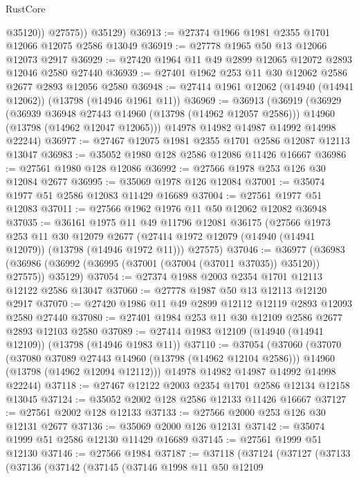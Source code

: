 \begin{lexlean}{RustCore}
\begin{coremodule}
              @35120))
          @27575))
      @35129)
@36913 := @27374 @1966 @1981 @2355 @1701 @12066 @12075 @2586 @13049
@36919 := @27778 @1965 @50 @13 @12066 @12073 @2917
@36929 := @27420 @1964 @11 @49 @2899 @12065 @12072 @2893 @12046 @2580 @27440
@36939 := @27401 @1962 @253 @11 @30 @12062 @2586 @2677 @2893 @12056 @2580
@36948 := @27414 @1961 @12062 (@14940 (@14941 @12062)) (@13798 (@14946 @1961 @11))
@36969 := @36913
    (@36919
      (@36929
        (@36939 @36948 @27443 @14960 (@13798 (@14962 @12057 @2586)))
        @14960
        (@13798 (@14962 @12047 @12065)))
      @14978
      @14982
      @14987
      @14992
      @14998
      @22244)
@36977 := @27467 @12075 @1981 @2355 @1701 @2586 @12087 @12113 @13047
@36983 := @35052 @1980 @128 @2586 @12086 @11426 @16667
@36986 := @27561 @1980 @128 @12086
@36992 := @27566 @1978 @253 @126 @30 @12084 @2677
@36995 := @35069 @1978 @126 @12084
@37001 := @35074 @1977 @51 @2586 @12083 @11429 @16689
@37004 := @27561 @1977 @51 @12083
@37011 := @27566 @1962 @1976 @11 @50 @12062 @12082 @36948
@37035 := @36161
    @1975
    @11
    @49
    @11796
    @12081
    @36175
    (@27566
      @1973
      @253
      @11
      @30
      @12079
      @2677
      (@27414 @1972 @12079 (@14940 (@14941 @12079)) (@13798 (@14946 @1972 @11)))
      @27575)
@37046 := @36977
    (@36983 (@36986 (@36992 (@36995 (@37001 (@37004 (@37011 @37035)) @35120)) @27575)) @35129)
@37054 := @27374 @1988 @2003 @2354 @1701 @12113 @12122 @2586 @13047
@37060 := @27778 @1987 @50 @13 @12113 @12120 @2917
@37070 := @27420 @1986 @11 @49 @2899 @12112 @12119 @2893 @12093 @2580 @27440
@37080 := @27401 @1984 @253 @11 @30 @12109 @2586 @2677 @2893 @12103 @2580
@37089 := @27414 @1983 @12109 (@14940 (@14941 @12109)) (@13798 (@14946 @1983 @11))
@37110 := @37054
    (@37060
      (@37070
        (@37080 @37089 @27443 @14960 (@13798 (@14962 @12104 @2586)))
        @14960
        (@13798 (@14962 @12094 @12112)))
      @14978
      @14982
      @14987
      @14992
      @14998
      @22244)
@37118 := @27467 @12122 @2003 @2354 @1701 @2586 @12134 @12158 @13045
@37124 := @35052 @2002 @128 @2586 @12133 @11426 @16667
@37127 := @27561 @2002 @128 @12133
@37133 := @27566 @2000 @253 @126 @30 @12131 @2677
@37136 := @35069 @2000 @126 @12131
@37142 := @35074 @1999 @51 @2586 @12130 @11429 @16689
@37145 := @27561 @1999 @51 @12130
@37146 := @27566 @1984
@37187 := @37118
    (@37124
      (@37127
        (@37133
          (@37136
            (@37142
              (@37145
                (@37146
                  @1998
                  @11
                  @50
                  @12109

\end{coremodule}
\end{lexlean}
